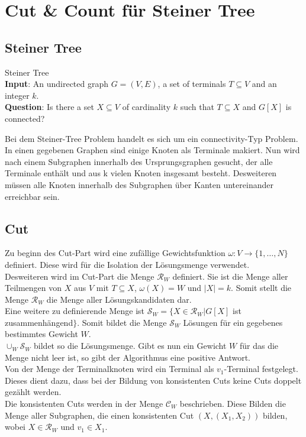 %
%
%
\chapter{Cut \& Count für Steiner Tree}
\label{c:cc_steiner}

\section{Steiner Tree}
\label{sec:steiner}
\begin{definition}
Steiner Tree\\
\textbf{Input}: An undirected graph $G = (V, E)$, a set of terminals $T \subseteq V$ and an integer $k$. \\
\textbf{Question}: Is there a set $X \subseteq V$ of cardinality $k$ such that $T \subseteq X$ and $G[X]$ is connected?
\end{definition}

Bei dem Steiner-Tree Problem handelt es sich um ein connectivity-Typ Problem. In einen gegebenen Graphen sind einige Knoten als Terminale makiert. Nun wird nach einem Subgraphen innerhalb des Ursprungsgraphen gesucht, der alle Terminale enthält und aus k vielen Knoten insgesamt besteht. Desweiteren müssen alle Knoten innerhalb des Subgraphen über Kanten untereinander erreichbar sein.

\section{Cut}
\label{sec:st_cut}
Zu beginn des Cut-Part wird eine zufällige Gewichtsfunktion $\omega:V\rightarrow \{1,\dots,N\}$ definiert. Diese wird für die Isolation der Lösungsmenge verwendet.\\
Desweiteren wird im Cut-Part die Menge $\mathcal{R}_W$ definiert. Sie ist die Menge aller Teilmengen von $X$ aus $V$ mit $T \subseteq X$, $\omega(X)=W$ und $|X|=k$. Somit stellt die Menge $\mathcal{R}_W$ die Menge aller Lösungskandidaten dar.\\
Eine weitere zu definierende Menge ist $\mathcal{S}_W=\{X \in \mathcal{R}_W | G[X]$ ist zusammenhängend$\}$. Somit bildet die Menge $\mathcal{S}_W$ Lösungen für ein gegebenes bestimmtes Gewicht $W$.\\
$\cup_W \mathcal{S}_W$ bildet so die Lösungsmenge. Gibt es nun ein Gewicht $W$ für das die Menge nicht leer ist, so gibt der Algorithmus eine positive Antwort.\\
Von der Menge der Terminalknoten wird ein Terminal als $v_1$-Terminal festgelegt. Dieses dient dazu, dass bei der Bildung von konsistenten Cuts keine Cuts doppelt gezählt werden.\\
Die konsistenten Cuts werden in der Menge  $\mathcal{C}_W$ beschrieben. Diese Bilden die Menge aller Subgraphen, die einen konsistenten Cut $(X,(X_1,X_2))$ bilden, wobei $X\in \mathcal{R}_W$ und $v_1 \in X_1$.

